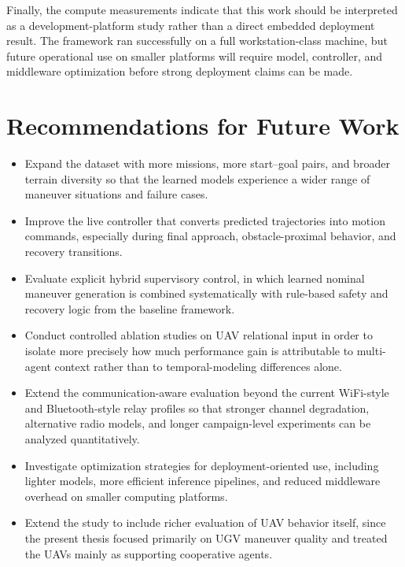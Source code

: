 Finally, the compute measurements indicate that this work should be interpreted as a development-platform study rather than a direct embedded deployment result. The framework ran successfully on a full workstation-class machine, but future operational use on smaller platforms will require model, controller, and middleware optimization before strong deployment claims can be made.

\section{Recommendations for Future Work}
\begin{itemize}
    \item Expand the dataset with more missions, more start--goal pairs, and broader terrain diversity so that the learned models experience a wider range of maneuver situations and failure cases.
    \item Improve the live controller that converts predicted trajectories into motion commands, especially during final approach, obstacle-proximal behavior, and recovery transitions.
    \item Evaluate explicit hybrid supervisory control, in which learned nominal maneuver generation is combined systematically with rule-based safety and recovery logic from the baseline framework.
    \item Conduct controlled ablation studies on UAV relational input in order to isolate more precisely how much performance gain is attributable to multi-agent context rather than to temporal-modeling differences alone.
    \item Extend the communication-aware evaluation beyond the current WiFi-style and Bluetooth-style relay profiles so that stronger channel degradation, alternative radio models, and longer campaign-level experiments can be analyzed quantitatively.
    \item Investigate optimization strategies for deployment-oriented use, including lighter models, more efficient inference pipelines, and reduced middleware overhead on smaller computing platforms.
    \item Extend the study to include richer evaluation of UAV behavior itself, since the present thesis focused primarily on UGV maneuver quality and treated the UAVs mainly as supporting cooperative agents.
\end{itemize}
